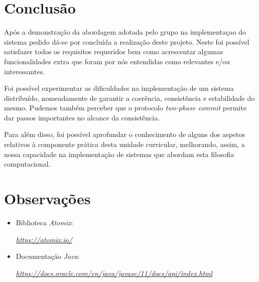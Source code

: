 \documentclass[a4paper]{report}
\begin{document}
\chapter{Conclusão}
\large{
	Após a demonstração da abordagem adotada pelo grupo na implementaçao do sistema pedido dá-se por concluída a realização deste projeto. 
	Neste foi possível satisfazer todos os requisitos requeridos bem como acrescentar algumas funcionalidades extra que foram por nós entendidas como relevantes e/ou interessantes.

	Foi possível experimentar as dificuldades na implementação de um sistema distribuído, nomeadamente de garantir a coerência, consistência e estabilidade do mesmo.
	Pudemos também perceber que o protocolo \textit{two-phase commit} permite dar passos importantes no alcance da consistência.

	Para além disso, foi possível aprofundar o conhecimento de alguns dos aspetos relativos à componente prática desta unidade curricular, melhorando, assim, 
	a nossa capacidade na implementação de sistemas que abordam esta filosofia computacional.
}

\appendix
\chapter{Observações}
\begin{itemize}
	\item Biblioteca \textit{Atomix}:
	\par \textit{\url{https://atomix.io/}}
	\item Documentação \textit{Java}:
	\par \textit{\url{https://docs.oracle.com/en/java/javase/11/docs/api/index.html}}
\end{itemize}
\end{document}
